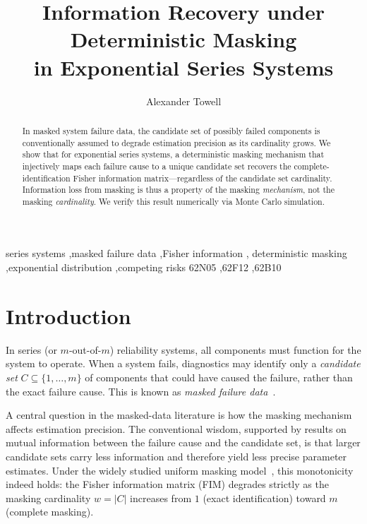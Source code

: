 \documentclass[preprint,12pt]{elsarticle}
\theoremstyle{definition}
\theoremstyle{remark}
\begin{document}
\begin{frontmatter}

\title{Information Recovery under Deterministic Masking\\in Exponential Series Systems}

\author[siue]{Alexander Towell}


\begin{abstract}
In masked system failure data, the candidate set of possibly failed components is
conventionally assumed to degrade estimation precision as its cardinality grows.
We show that for exponential series systems, a deterministic masking mechanism
that injectively maps each failure cause to a unique candidate set recovers the
complete-identification Fisher information matrix---regardless of the candidate
set cardinality. Information loss from masking is thus a property of the masking
\emph{mechanism}, not the masking \emph{cardinality}. We verify this result
numerically via Monte Carlo simulation.
\end{abstract}

\begin{keyword}
series systems \sep masked failure data \sep Fisher information \sep
deterministic masking \sep exponential distribution \sep competing risks
\MSC[2020] 62N05 \sep 62F12 \sep 62B10
\end{keyword}

\end{frontmatter}

\section{Introduction}
\label{sec:introduction}

In series (or $m$-out-of-$m$) reliability systems, all components must function
for the system to operate. When a system fails, diagnostics may identify only a
\emph{candidate set} $C \subseteq \{1,\ldots,m\}$ of components that could have
caused the failure, rather than the exact failure cause. This is known as
\emph{masked failure data}~\cite{miyakawa1984}.

A central question in the masked-data literature is how the masking mechanism
affects estimation precision. The conventional wisdom, supported by results on
mutual information between the failure cause and the candidate set, is that
larger candidate sets carry less information and therefore yield less precise
parameter estimates. Under the widely studied uniform masking
model~\cite{miyakawa1984, towell2023reliability, towell2025masked}, this monotonicity indeed
holds: the Fisher information matrix (FIM) degrades strictly as the masking
cardinality $w = |C|$ increases from $1$ (exact identification) toward $m$
(complete masking).
\end{document}
